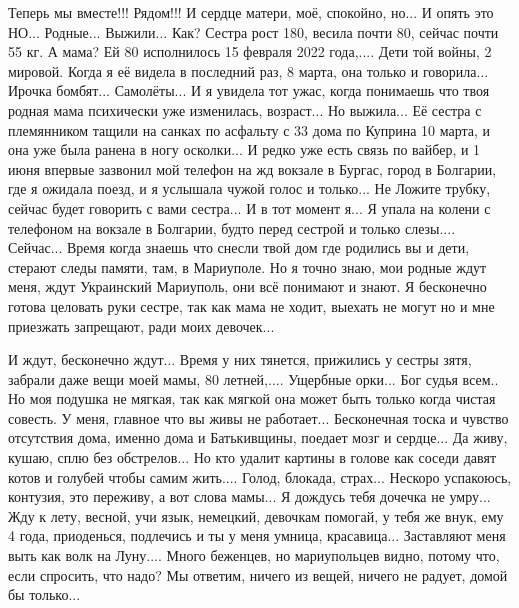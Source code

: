 Теперь мы вместе!!! Рядом!!! И сердце матери, моё, спокойно, но... И опять это
НО... Родные... Выжили... Как? Сестра рост 180, весила почти 80, сейчас почти
55 кг. А мама? Ей 80 исполнилось 15 февраля 2022 года,.... Дети той войны, 2
мировой. Когда я её видела в последний раз, 8 марта, она только и говорила...
Ирочка бомбят... Самолёты... И я увидела тот ужас, когда понимаешь что твоя
родная мама психически уже изменилась, возраст... Но выжила... Её сестра с
племянником тащили на санках по асфальту с 33 дома по Куприна 10 марта, и она
уже была ранена в ногу осколки... И редко уже есть связь по вайбер, и 1 июня
впервые зазвонил мой телефон на жд вокзале в Бургас, город в Болгарии, где я
ожидала поезд, и я услышала чужой голос и только... Не Ложите трубку,  сейчас
будет говорить с вами сестра... И в тот момент я... Я упала на колени с
телефоном на вокзале в Болгарии, будто перед сестрой и только слезы....
Сейчас... Время когда знаешь что снесли твой дом где родились вы и дети,
стерают следы памяти, там, в Мариуполе. Но я точно знаю, мои родные ждут меня,
ждут Украинский Мариуполь, они всё понимают и знают. Я бесконечно готова
целовать руки сестре, так как мама не ходит, выехать не могут но и мне
приезжать запрещают, ради моих девочек...

И ждут, бесконечно ждут... Время у них тянется, прижились у сестры зятя,
забрали даже вещи моей мамы, 80 летней,.... Ущербные орки... Бог судья всем..
Но моя подушка не мягкая, так как мягкой она может быть только когда чистая
совесть. У меня, главное что вы живы не работает... Бесконечная тоска и чувство
отсутствия дома, именно дома и Батькивщины, поедает мозг и сердце... Да живу,
кушаю, сплю без обстрелов... Но кто удалит картины в голове как соседи давят
котов и голубей чтобы самим жить.... Голод, блокада, страх... Нескоро
успакоюсь, контузия, это переживу, а вот слова мамы... Я дождусь тебя дочечка
не умру... Жду к лету, весной, учи язык, немецкий, девочкам помогай, у тебя же
внук, ему 4 года, приоденься, подлечись и ты у меня умница, красавица...
Заставляют меня выть как волк на Луну.... Много беженцев, но  мариупольцев
видно, потому что, если спросить, что надо? Мы ответим, ничего из вещей, ничего
не радует, домой бы только...
